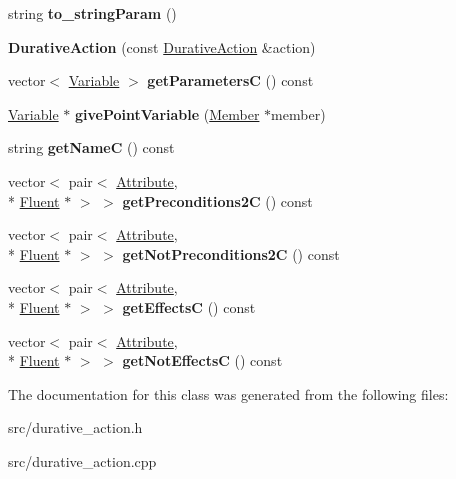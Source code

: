 \begin{DoxyCompactItemize}
\item 
\hypertarget{classDurativeAction_a0d97529614687778b1e2b1ffd56ca688}{string {\bfseries to\+\_\+string\+Param} ()}\label{classDurativeAction_a0d97529614687778b1e2b1ffd56ca688}

\item 
\hypertarget{classDurativeAction_aa3fa3af91c1f995c10244468af9c7160}{{\bfseries Durative\+Action} (const \hyperlink{classDurativeAction}{Durative\+Action} \&action)}\label{classDurativeAction_aa3fa3af91c1f995c10244468af9c7160}

\item 
\hypertarget{classDurativeAction_a9ae4a1bfee1889c1ef4033a36804d1d7}{vector$<$ \hyperlink{classVariable}{Variable} $>$ {\bfseries get\+Parameters\+C} () const }\label{classDurativeAction_a9ae4a1bfee1889c1ef4033a36804d1d7}

\item 
\hypertarget{classDurativeAction_a65604bf41b7a43d05a07169457ef66a1}{\hyperlink{classVariable}{Variable} $\ast$ {\bfseries give\+Point\+Variable} (\hyperlink{classMember}{Member} $\ast$member)}\label{classDurativeAction_a65604bf41b7a43d05a07169457ef66a1}

\item 
\hypertarget{classDurativeAction_acc2c6602296614e82165543da0a9a276}{string {\bfseries get\+Name\+C} () const }\label{classDurativeAction_acc2c6602296614e82165543da0a9a276}

\item 
\hypertarget{classDurativeAction_a9f24d997312b4c9f6d3891915189ea51}{vector$<$ pair$<$ \hyperlink{classAttribute}{Attribute}, \\*
\hyperlink{classFluent}{Fluent} $\ast$ $>$ $>$ {\bfseries get\+Preconditions2\+C} () const }\label{classDurativeAction_a9f24d997312b4c9f6d3891915189ea51}

\item 
\hypertarget{classDurativeAction_ac687f39e03927f4878123065a4d900a4}{vector$<$ pair$<$ \hyperlink{classAttribute}{Attribute}, \\*
\hyperlink{classFluent}{Fluent} $\ast$ $>$ $>$ {\bfseries get\+Not\+Preconditions2\+C} () const }\label{classDurativeAction_ac687f39e03927f4878123065a4d900a4}

\item 
\hypertarget{classDurativeAction_a7e7f80cb467b893016729b6d6029bfef}{vector$<$ pair$<$ \hyperlink{classAttribute}{Attribute}, \\*
\hyperlink{classFluent}{Fluent} $\ast$ $>$ $>$ {\bfseries get\+Effects\+C} () const }\label{classDurativeAction_a7e7f80cb467b893016729b6d6029bfef}

\item 
\hypertarget{classDurativeAction_acbbd55cc16bd9bf90301817cc3f708f7}{vector$<$ pair$<$ \hyperlink{classAttribute}{Attribute}, \\*
\hyperlink{classFluent}{Fluent} $\ast$ $>$ $>$ {\bfseries get\+Not\+Effects\+C} () const }\label{classDurativeAction_acbbd55cc16bd9bf90301817cc3f708f7}

\end{DoxyCompactItemize}


The documentation for this class was generated from the following files\+:\begin{DoxyCompactItemize}
\item 
src/durative\+\_\+action.\+h\item 
src/durative\+\_\+action.\+cpp\end{DoxyCompactItemize}

